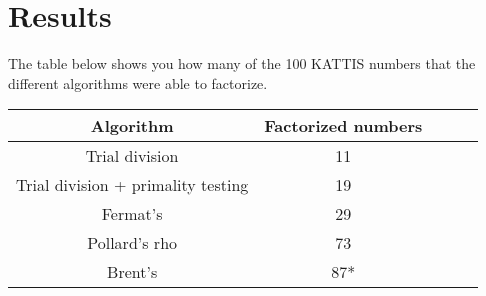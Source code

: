 \documentclass[paper=a4, fontsize=11pt,numbers=endperiod]{scrartcl} %
\numberwithin{equation}{section} %
\numberwithin{figure}{section} %
\numberwithin{table}{section} %
\begin{document}


\section{Results}

The table below shows you how many of the 100 KATTIS numbers that the different algorithms were able to factorize.

    \begin{tabular}{|c|c|c|c|c|}
    \hline
    \textbf{Algorithm} & \textbf{Factorized numbers} \\ \hline
    Trial division & 11 \\ \hline
    Trial division + primality testing & 19 \\ \hline
    Fermat's & 29 \\ \hline
    Pollard's rho & 73 \\ \hline
    Brent's & 87* \\ \hline
    \end{tabular}
    \hspace{10pt}
\end{document}
